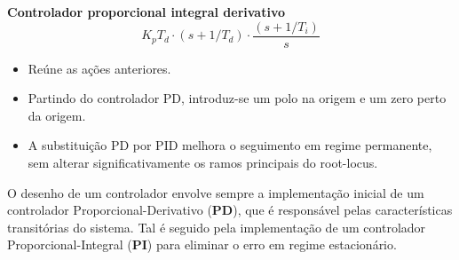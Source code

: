 \noindent \textbf{Controlador proporcional integral derivativo}
$$
    K_pT_d\cdot(s + 1/T_d)\cdot \dfrac{(s + 1/T_i)}{s}
$$
\begin{itemize}
    \item Reúne as ações anteriores.
    \item Partindo do controlador PD, introduz-se um polo na origem e um zero perto da origem.
    \item A substituição PD por PID melhora o seguimento em regime permanente, sem alterar significativamente os ramos principais do root-locus.
\end{itemize}

{

\begin{mdframed}
    \noindent O desenho de um controlador envolve sempre a implementação inicial de um controlador Proporcional-Derivativo (\textbf{PD}), que é responsável pelas características transitórias do sistema. Tal é seguido pela implementação de um controlador Proporcional-Integral (\textbf{PI}) para eliminar o erro em regime estacionário.
\end{mdframed}
}